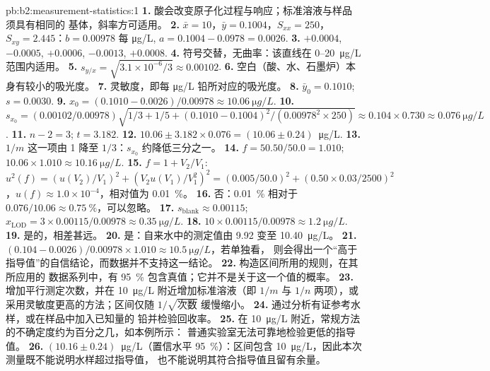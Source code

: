 \begin{solution}{pb:b2:measurement-statistics:1}
\textbf{1.} 酸会改变原子化过程与响应；标准溶液与样品须具有相同的
基体，斜率方可适用。
\textbf{2.} $\bar x = 10$，$\bar y = 0.1004$，$S_{xx} = 250$，$S_{xy} = 2.445$：$b = 0.00978$ 每
\unit{\micro g/L}, $a = 0.1004 - 0.0978 = 0.0026$.
\textbf{3.} $+0.0004$, $-0.0005$, $+0.0006$, $-0.0013$, $+0.0008$.
\textbf{4.} 符号交替，无曲率：该直线在 0--\qty{20}{\micro g/L} 范围内适用。
\textbf{5.} $s_{y/x} = \sqrt{3.1 \times 10^{-6}/3} \approx 0.00102$.
\textbf{6.} 空白（酸、水、石墨炉）本身有较小的吸光度。
\textbf{7.} 灵敏度，即每 \unit{\micro g/L} 铅所对应的吸光度。
\textbf{8.} $\bar y_0 = 0.1010$; $s = 0.0030$.
\textbf{9.} $x_0 = (0.1010 - 0.0026)/0.00978 \approx \qty{10.06}{\micro g/L}$.
\textbf{10.} $s_{x_0} = (0.00102/0.00978)\sqrt{1/3 + 1/5 + (0.1010 - 0.1004)^2/(0.00978^2 \times 250)}
\approx 0.104 \times 0.730 \approx \qty{0.076}{\micro g/L}$.
\textbf{11.} $n - 2 = 3$; $t = 3.182$.
\textbf{12.} $10.06 \pm 3.182 \times 0.076 = (10.06 \pm 0.24)$~\unit{\micro g/L}.
\textbf{13.} $1/m$ 这一项由 1 降至 $1/3$：$s_{x_0}$ 约降低三分之一。
\textbf{14.} $f = 50.50/50.0 = 1.010$; $10.06 \times 1.010 \approx \qty{10.16}{\micro g/L}$.
\textbf{15.} $f = 1 + V_2/V_1$: $u^2(f) = (u(V_2)/V_1)^2 + (V_2u(V_1)/V_1^2)^2 = (0.005/50.0)^2 +
(0.50 \times 0.03/2500)^2$，$u(f) \approx 1.0 \times 10^{-4}$，相对值为 0.01~\%。
\textbf{16.} 否：0.01~\% 相对于 $0.076/10.06 \approx 0.75~\%$，可以忽略。
\textbf{17.} $s_{\mathrm{blank}} \approx 0.00115$; $x_{\mathrm{LOD}} = 3 \times 0.00115/0.00978 \approx
\qty{0.35}{\micro g/L}$.
\textbf{18.} $10 \times 0.00115/0.00978 \approx \qty{1.2}{\micro g/L}$.
\textbf{19.} 是的，相差甚远。
\textbf{20.} 是：自来水中的测定值由 9.92 变至 \qty{10.40}{\micro g/L}。
\textbf{21.} $(0.104 - 0.0026)/0.00978 \times 1.010 \approx \qty{10.5}{\micro g/L}$，若单独看，
则会得出一个“高于指导值”的自信结论，而数据并不支持这一结论。
\textbf{22.} 构造区间所用的规则，在其所应用的
数据系列中，有 95~\% 包含真值；它并不是关于这一个值的概率。
\textbf{23.} 增加平行测定次数，并在 \qty{10}{\micro g/L} 附近增加标准溶液（即 $1/m$ 与
$1/n$ 两项），或采用灵敏度更高的方法；区间仅随 $1/\sqrt{\text{次数}}$ 缓慢缩小。
\textbf{24.} 通过分析有证参考水样，或在样品中加入已知量的
铅并检验回收率。
\textbf{25.} 在 \qty{10}{\micro g/L} 附近，常规方法的不确定度约为百分之几，如本例所示：
普通实验室无法可靠地检验更低的指导值。
\textbf{26.} $\boldsymbol{(10.16 \pm 0.24)}$~\unit{\micro g/L}（置信水平 95~\%）：区间包含
\qty{10}{\micro g/L}，因此本次测量既不能说明水样超过指导值，
也不能说明其符合指导值且留有余量。
\end{solution}
